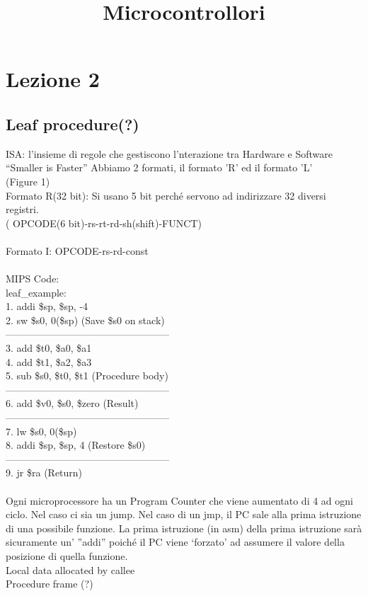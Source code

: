 \documentclass[12pt, a4paper]{article}
\title{Microcontrollori}
\date{}
\begin{document}
	\maketitle
	
	\section*{Lezione 2}
	\subsection*{Leaf procedure(?)}
	ISA: l'insieme di regole che gestiscono l'nterazione tra Hardware e Software
	``Smaller is Faster''
	Abbiamo 2 formati, il formato 'R' ed il formato 'L'\\
	(Figure 1) \\
	
	Formato R(32 bit): Si usano 5 bit perché servono ad indirizzare 32 diversi registri.\\
		( OPCODE(6 bit)-rs-rt-rd-sh(shift)-FUNCT)\\ \\
	Formato I: OPCODE-rs-rd-const\\ \\
	MIPS Code: \\ 
	leaf\_example:\\
	1. addi \$sp, \$sp, -4  \\ 
	2. sw \$s0, 0(\$sp)  \quad(Save \$s0 on stack) \\
	-------------------------------------------------- \\
	3. add \$t0, \$a0, \$a1 \\
	4. add \$t1, \$a2, \$a3 \\
	5. sub \$s0, \$t0, \$t1     \quad(Procedure body) \\
	-------------------------------------------------- \\
	6. add \$v0, \$s0, \$zero    \quad(Result) \\
	-------------------------------------------------- \\
	7. lw \$s0, 0(\$sp) \\
	8. addi \$sp, \$sp, 4 	\quad(Restore \$s0) \\
	-------------------------------------------------- \\
	9. jr \$ra   \quad(Return) \\ \\
	
	Ogni microprocessore ha un Program Counter che viene aumentato di 4 ad ogni ciclo. Nel caso ci sia un jump. Nel caso di un jmp, il PC sale alla prima istruzione di una possibile funzione. La prima istruzione (in asm) della prima istruzione sarà sicuramente un' ''addi'' poiché il PC viene `forzato' ad assumere il valore della posizione di quella funzione. \\
	Local data allocated by callee \\
	Procedure frame (?) \\ \\
	
\end{document}
